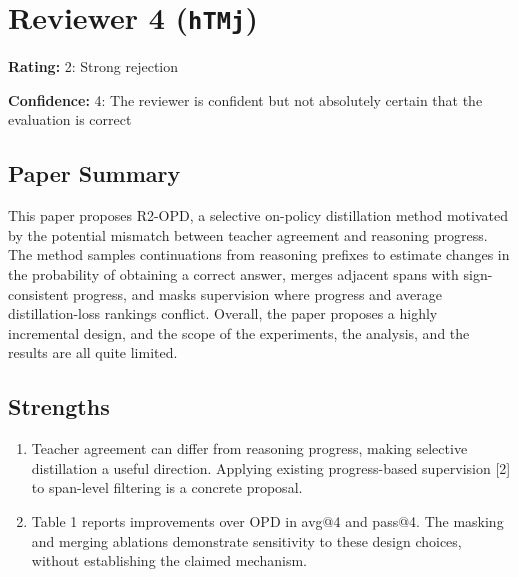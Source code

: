 \section{Reviewer 4 (\texttt{hTMj})}
\label{reviewer:4}
\noindent\textbf{Rating:} 2: Strong rejection\par
\noindent\textbf{Confidence:} 4: The reviewer is confident but not absolutely certain that the evaluation is correct

\subsection*{Paper Summary}
This paper proposes R2-OPD, a selective on-policy distillation method motivated by the potential mismatch between teacher agreement and reasoning progress. The method samples continuations from reasoning prefixes to estimate changes in the probability of obtaining a correct answer, merges adjacent spans with sign-consistent progress, and masks supervision where progress and average distillation-loss rankings conflict. Overall, the paper proposes a highly incremental design, and the scope of the experiments, the analysis, and the results are all quite limited.

\subsection*{Strengths}
\begin{enumerate}
\item Teacher agreement can differ from reasoning progress, making selective distillation a useful direction. Applying existing progress-based supervision [2] to span-level filtering is a concrete proposal.
\item Table 1 reports improvements over OPD in avg@4 and pass@4. The masking and merging ablations demonstrate sensitivity to these design choices, without establishing the claimed mechanism.
\end{enumerate}

